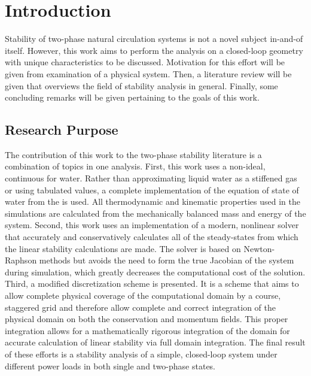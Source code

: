 \chapter{Introduction}

Stability of two-phase natural circulation systems is not a novel subject in-and-of itself.
However, this work aims to perform the analysis on a closed-loop geometry with unique characteristics to be discussed.
Motivation for this effort will be given from examination of a physical system.
Then, a literature review will be given that overviews the field of stability analysis in general.
Finally, some concluding remarks will be given pertaining to the goals of this work.

\newpage
{}

\section{Research Purpose}\label{Section:Purpose}

The contribution of this work to the two-phase stability literature is a combination of topics in one analysis.
First, this work uses a non-ideal, continuous  for water.
Rather than approximating liquid water as a stiffened gas \cite{hayward_compressibility_1967-1} or using tabulated values, a complete implementation of the equation of state of water from the  is used.
All thermodynamic and kinematic properties used in the simulations are calculated from the mechanically balanced mass and energy of the system.
Second, this work uses an implementation of a modern, nonlinear solver that accurately and conservatively calculates all of the steady-states from which the linear stability calculations are made.
The solver is based on Newton-Raphson methods but avoids the need to form the true Jacobian of the system during simulation, which greatly decreases the computational cost of the solution.
Third, a modified discretization scheme is presented.
It is a scheme that aims to allow complete physical coverage of the computational domain by a course, staggered grid and therefore allow complete and correct integration of the physical domain on both the conservation and momentum fields.
This proper integration allows for a mathematically rigorous integration of the domain for accurate calculation of linear stability via full domain integration.
The final result of these efforts is a stability analysis of a simple, closed-loop system under different power loads in both single and two-phase states.






